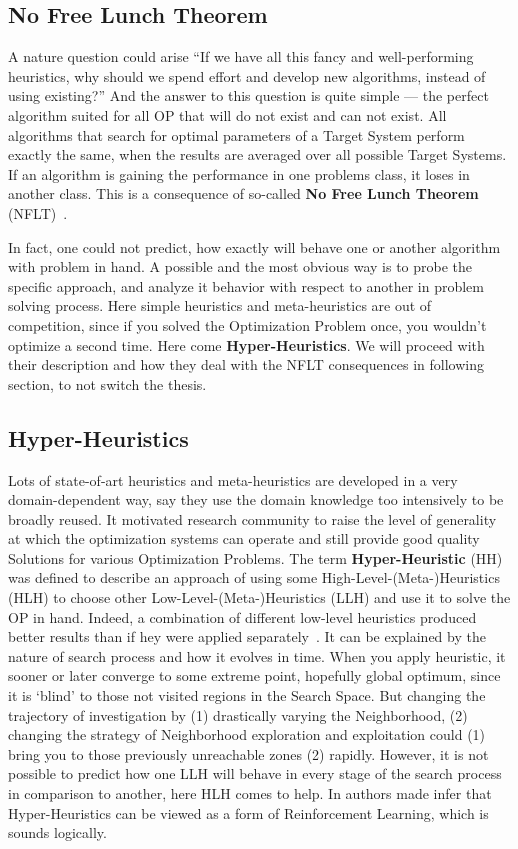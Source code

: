 \subsection{No Free Lunch Theorem}
A nature question could arise ``If we have all this fancy and well-performing heuristics, why should we spend effort and develop new algorithms, instead of using existing?'' And the answer to this question is quite simple — the perfect algorithm suited for all OP that will do not exist and can not exist. All algorithms that search for optimal parameters of a Target System perform exactly the same, when the results are averaged over all possible Target Systems. If an algorithm is gaining the performance in one problems class, it loses in another class. This is a consequence of so-called \textbf{No Free Lunch Theorem} (NFLT)~\cite{wolpert1997no}.

In fact, one could not predict, how exactly will behave one or another algorithm with problem in hand. A possible and the most obvious way is to probe the specific approach, and analyze it behavior with respect to another in problem solving process. Here simple heuristics and meta-heuristics are out of competition, since if you solved the Optimization Problem once, you wouldn't optimize a second time.
Here come \textbf{Hyper-Heuristics}. We will proceed with their description and how they deal with the NFLT consequences in following section, to not switch the thesis.


\subsection{Hyper-Heuristics}\label{bg: hh}
Lots of state-of-art heuristics and meta-heuristics are developed in a very domain-dependent way, say they use the domain knowledge too intensively to be broadly reused. It motivated research community to raise the level of generality at which the optimization systems can operate and still provide good quality Solutions for various Optimization Problems. The term \textbf{Hyper-Heuristic} (HH) was defined to describe an approach of using some High-Level-(Meta-)Heuristics (HLH) to choose other Low-Level-(Meta-)Heuristics (LLH) and use it to solve the OP in hand. Indeed, a combination of different low-level heuristics produced better results than if hey were applied separately~\cite{drake2019recent}.
It can be explained by the nature of search process and how it evolves in time. When you apply heuristic, it sooner or later converge to some extreme point, hopefully global optimum, since it is `blind' to those not visited regions in the Search Space. But changing the trajectory of investigation by (1) drastically varying the Neighborhood, (2) changing the strategy of Neighborhood exploration and exploitation could (1) bring you to those previously unreachable zones (2) rapidly. However, it is not possible to predict how one LLH will behave in every stage of the search process in comparison to another, here HLH comes to help. In \cite{moriarty1999evolutionary} authors made infer that Hyper-Heuristics can be viewed as a form of Reinforcement Learning, which is sounds logically.

